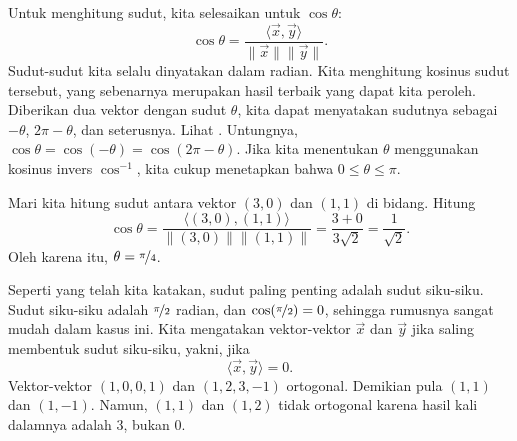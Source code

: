 Untuk menghitung sudut, kita selesaikan untuk $\cos \theta$:
\begin{equation*}
\cos \theta
=
\frac{\langle \vec{x}, \vec{y} \rangle}{\lVert{\vec{x}}\rVert
\lVert{\vec{y}}\rVert} .
\end{equation*}
Sudut-sudut kita selalu dinyatakan dalam radian.
Kita menghitung kosinus sudut tersebut,
yang sebenarnya merupakan hasil terbaik
yang dapat kita peroleh. Diberikan dua vektor dengan sudut $\theta$, kita dapat menyatakan sudutnya sebagai
$-\theta$, $2\pi-\theta$, dan seterusnya.
Lihat .
Untungnya,
$\cos \theta = \cos (-\theta) = \cos(2\pi - \theta)$.
Jika kita menentukan $\theta$ menggunakan kosinus invers $\cos^{-1}$,
kita cukup menetapkan bahwa $0 \leq \theta \leq \pi$.

\begin{myfig}
\capstart
{}
\caption{Sudut antara vektor-vektor.\label{vec-angle:fig}}
\end{myfig}

\begin{example}
Mari kita hitung sudut antara vektor $(3,0)$ dan $(1,1)$ di
bidang.
Hitung
\begin{equation*}
\cos \theta =
\frac{\bigl\langle (3,0) , (1,1) \bigr\rangle}{\lVert(3,0)\rVert \lVert(1,1)\rVert}
=
\frac{3 + 0}{3 \sqrt{2}} = \frac{1}{\sqrt{2}} .
\end{equation*}
Oleh karena itu, $\theta = \nicefrac{\pi}{4}$.
\end{example}

Seperti yang telah kita katakan, sudut paling penting adalah sudut siku-siku. Sudut siku-siku
adalah $\nicefrac{\pi}{2}$ radian, dan $\cos (\nicefrac{\pi}{2}) = 0$, sehingga
rumusnya sangat mudah dalam kasus ini.
Kita mengatakan
vektor-vektor $\vec{x}$ dan $\vec{y}$
\emph{} jika saling membentuk sudut siku-siku,
yakni, jika
\begin{equation*}
\langle \vec{x} , \vec{y} \rangle
=
0 .
\end{equation*}
Vektor-vektor $(1,0,0,1)$ dan $(1,2,3,-1)$ ortogonal. Demikian pula
$(1,1)$ dan $(1,-1)$. Namun, $(1,1)$ dan $(1,2)$ tidak ortogonal karena
hasil kali dalamnya adalah $3$, bukan 0.

